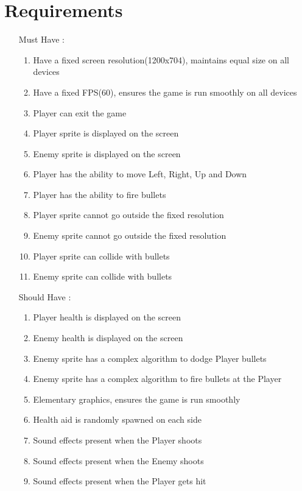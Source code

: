 \documentclass[12pt]{article}
\begin{document}
\section{Requirements}
\begin{itemize}
    
    \item[Must Have]:
    \begin{enumerate}
        \item Have a fixed screen resolution(1200x704), maintains equal size on all devices
        \item Have a fixed FPS(60), ensures the game is run smoothly on all devices
        \item Player can exit the game
        \item Player sprite is displayed on the screen
        \item Enemy sprite is displayed  on the screen
        \item Player has the ability to move Left, Right, Up and Down
        \item Player has the ability to fire bullets
        \item Player sprite cannot go outside the fixed resolution
        \item Enemy sprite cannot go outside the fixed resolution
        \item Player sprite can collide with bullets
        \item Enemy sprite can collide with bullets
    \end{enumerate}
    \item[Should Have]:
    \begin{enumerate}
        \item Player health is displayed on the screen
        \item Enemy health is displayed on the screen
        \item Enemy sprite has a complex algorithm to dodge Player bullets
        \item Enemy sprite has a complex algorithm to fire bullets at the Player
        \item Elementary graphics, ensures the game is run smoothly
        \item Health aid is randomly spawned on each side
        \item Sound effects present when the Player shoots
        \item Sound effects present when the Enemy shoots
        \item Sound effects present when the Player gets hit

\end{enumerate}
\end{itemize}
\end{document}
